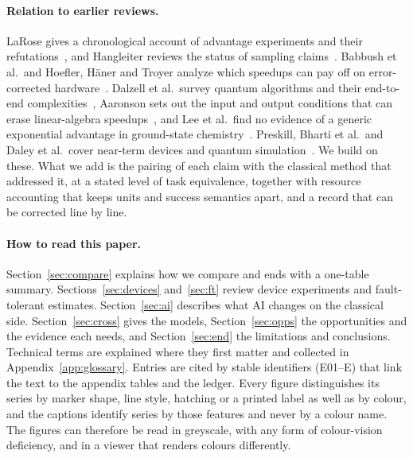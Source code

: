 \paragraph{Relation to earlier reviews.} LaRose gives a chronological account of advantage experiments and their refutations~\cite{larose2026}, and Hangleiter reviews the status of sampling claims~\cite{hangleiter2026}. Babbush et al.\ and Hoefler, H\"aner and Troyer analyze which speedups can pay off on error-corrected hardware~\cite{babbush2021,hoefler2023}. Dalzell et al.\ survey quantum algorithms and their end-to-end complexities~\cite{dalzell2023}, Aaronson sets out the input and output conditions that can erase linear-algebra speedups~\cite{aaronson2015}, and Lee et al.\ find no evidence of a generic exponential advantage in ground-state chemistry~\cite{lee2023}. Preskill, Bharti et al.\ and Daley et al.\ cover near-term devices and quantum simulation~\cite{preskill2018,bharti2022,daley2022}. We build on these. What we add is the pairing of each claim with the classical method that addressed it, at a stated level of task equivalence, together with resource accounting that keeps units and success semantics apart, and a record that can be corrected line by line.

\paragraph{How to read this paper.} Section~\ref{sec:compare} explains how we compare and ends with a one-table summary. Sections~\ref{sec:devices} and~\ref{sec:ft} review device experiments and fault-tolerant estimates. Section~\ref{sec:ai} describes what AI changes on the classical side. Section~\ref{sec:cross} gives the models, Section~\ref{sec:opps} the opportunities and the evidence each needs, and Section~\ref{sec:end} the limitations and conclusions. Technical terms are explained where they first matter and collected in Appendix~\ref{app:glossary}. Entries are cited by stable identifiers (E01--E\nEntries) that link the text to the appendix tables and the ledger. Every figure distinguishes its series by marker shape, line style, hatching or a printed label as well as by colour, and the captions identify series by those features and never by a colour name. The figures can therefore be read in greyscale, with any form of colour-vision deficiency, and in a viewer that renders colours differently.
